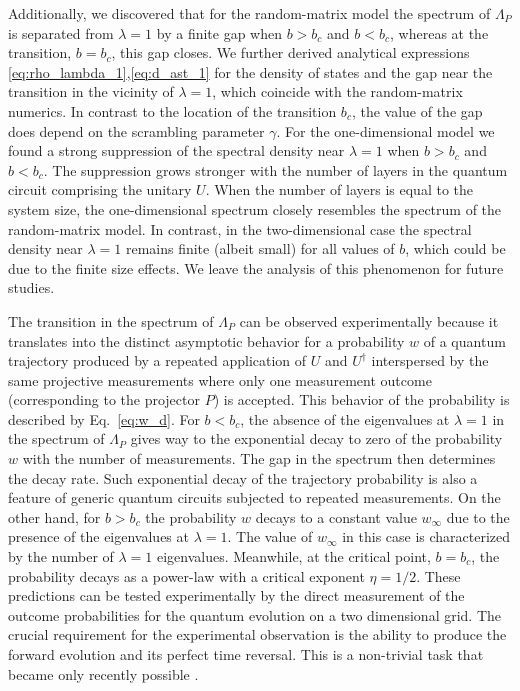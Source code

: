 \documentclass[%
 reprint,
 superscriptaddress,
 amsmath,amssymb,
prx,
]{revtex4-2}\href{\href{}{}}{}
\begin{document}
Additionally, we discovered that for the random-matrix model the spectrum of $\Lambda_P$ is separated from $\lambda=1$ by a finite gap when $b>b_c$ and $b<b_c$, whereas at the transition, $b=b_c$, this gap closes.
We further derived analytical expressions \eqref{eq:rho_lambda_1},\eqref{eq:d_ast_1} for the density of states and the gap near the transition in the vicinity of $\lambda=1$, which coincide with the random-matrix numerics.
In contrast to the location of the transition $b_c$, the value of the gap does depend on the scrambling parameter $\gamma$.
For the one-dimensional model we found a strong suppression of the spectral density near $\lambda=1$ when $b>b_c$ and $b<b_c$.
The suppression grows stronger with the number of layers in the quantum circuit comprising the unitary $U$.
When the number of layers is equal to the system size, the one-dimensional spectrum closely resembles the spectrum of the random-matrix model.
In contrast, in the two-dimensional case the spectral density near $\lambda=1$ remains finite (albeit small) for all values of $b$, which could be due to the finite size effects.
We leave the analysis of this phenomenon for future studies.


The transition in the spectrum of $\Lambda_P$ can be observed experimentally because it translates into the distinct asymptotic behavior for a probability $w$ of a quantum trajectory produced by a repeated application of $U$ and $U^{\dag}$ interspersed by the same projective measurements where only one measurement outcome (corresponding to the projector $P$) is accepted.
This behavior of the probability is described by Eq.~\eqref{eq:w_d}.
For $b<b_c$, the absence of the eigenvalues at $\lambda=1$ in the spectrum of  $\Lambda_P$ gives way to the exponential decay to zero of the probability $w$ with the number of measurements.
The gap in the spectrum then determines the decay rate.
Such exponential decay of the trajectory probability is also a feature of generic quantum circuits subjected to repeated measurements.
On the other hand, for $b>b_c$ the probability $w$ decays to a constant value $w_{\infty}$ due to the presence of the eigenvalues at $\lambda=1$.
The value of $w_{\infty}$ in this case is characterized by the number of $\lambda=1$ eigenvalues.
Meanwhile, at the critical point, $b=b_c$, the probability decays as a power-law with a critical exponent $\eta=1/2$.
These predictions can be tested experimentally by the direct measurement of the outcome probabilities for the quantum evolution on a two dimensional grid. The crucial requirement for the experimental observation is the ability to produce the forward evolution and its perfect time reversal. This is a non-trivial task that became only recently possible \cite{Mi2021}.  
\end{document}
